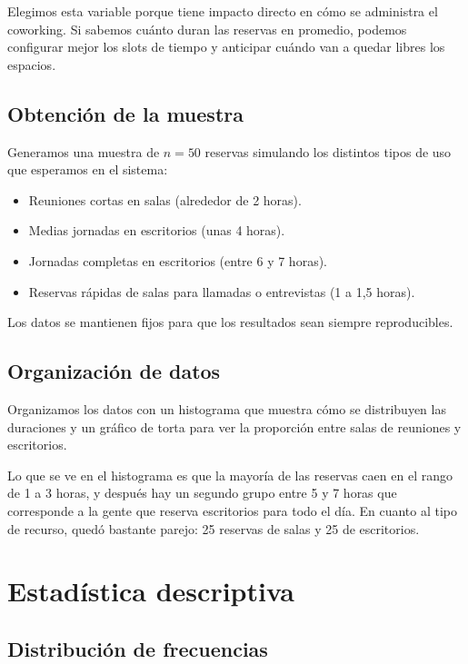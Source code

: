 \documentclass[12pt,a4paper]{article}
\begin{document}
Elegimos esta variable porque tiene impacto directo en cómo se administra el coworking. Si sabemos cuánto duran las reservas en promedio, podemos configurar mejor los slots de tiempo y anticipar cuándo van a quedar libres los espacios.

\subsection{Obtención de la muestra}

Generamos una muestra de $n = 50$ reservas simulando los distintos tipos de uso que esperamos en el sistema:

\begin{itemize}[itemsep=4pt]
  \item Reuniones cortas en salas (alrededor de 2 horas).
  \item Medias jornadas en escritorios (unas 4 horas).
  \item Jornadas completas en escritorios (entre 6 y 7 horas).
  \item Reservas rápidas de salas para llamadas o entrevistas (1 a 1,5 horas).
\end{itemize}

Los datos se mantienen fijos para que los resultados sean siempre reproducibles.

\subsection{Organización de datos}

Organizamos los datos con un histograma que muestra cómo se distribuyen las duraciones y un gráfico de torta para ver la proporción entre salas de reuniones y escritorios.

Lo que se ve en el histograma es que la mayoría de las reservas caen en el rango de 1 a 3 horas, y después hay un segundo grupo entre 5 y 7 horas que corresponde a la gente que reserva escritorios para todo el día. En cuanto al tipo de recurso, quedó bastante parejo: 25 reservas de salas y 25 de escritorios.

\section{Estadística descriptiva}

\subsection{Distribución de frecuencias}
\end{document}
